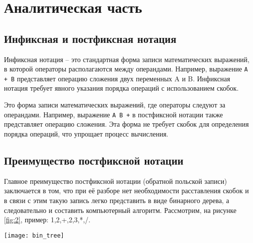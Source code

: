 \chapter{Аналитическая часть}
\section{Инфиксная и постфиксная нотация}
Инфиксная нотация -- это стандартная форма записи математических выражений, в которой операторы располагаются между операндами. Например, выражение \texttt{A + B} представляет операцию сложения двух переменных A и B. Инфиксная нотация требует явного указания порядка операций с использованием скобок.

Это форма записи математических выражений, где операторы следуют за операндами. Например, выражение \texttt{A B +} в постфиксной нотации также представляет операцию сложения. Эта форма не требует скобок для определения порядка операций, что упрощает процесс вычисления.
\section{Преимущество постфиксной нотации}
Главное преимущество постфиксной нотации (обратной польской записи) заключается в том, что при её разборе нет необходимости расставления скобок и в связи с этим такую запись легко представить в виде бинарного дерева, а следовательно и составить компьютерный алгоритм. Рассмотрим, на рисунке \ref{fig:2}, пример: 1,2,+,2,3,*,/.
\begin{center}
	\texttt{[image: bin\_tree]}
	\label{fig:2}
\end{center}
\clearpage
